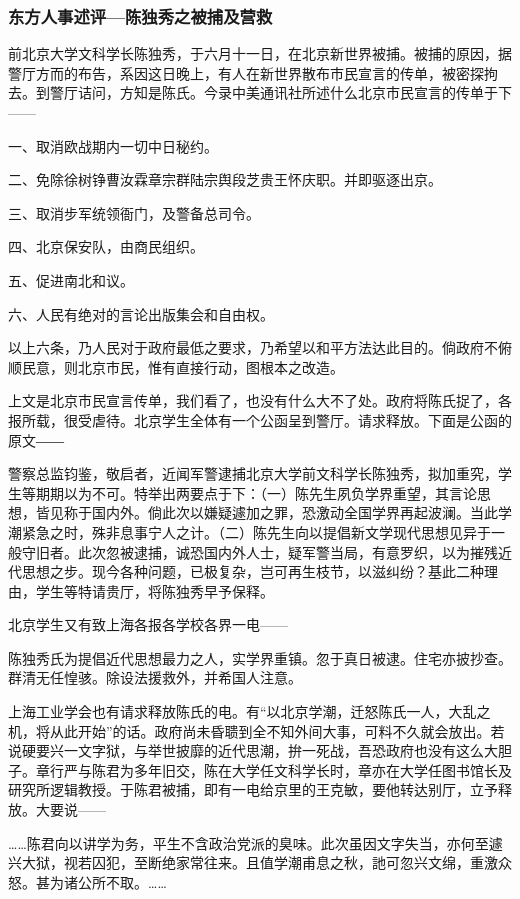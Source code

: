 \subsubsection{东方人事述评—陈独秀之被捕及营救}

前北京大学文科学长陈独秀，于六月十一日，在北京新世界被捕。被捕的原因，据警厅方而的布告，系因这日晚上，有人在新世界散布市民宣言的传单，被密探拘去。到警厅诘问，方知是陈氏。今录中美通讯社所述什么北京市民宣言的传单于下——

一、取消欧战期内一切中日秘约。

二、免除徐树铮曹汝霖章宗群陆宗舆段芝贵王怀庆职。并即驱逐出京。

三、取消步军统领衙门，及警备总司令。

四、北京保安队，由商民组织。

五、促进南北和议。

六、人民有绝对的言论出版集会和自由权。

以上六条，乃人民对于政府最低之要求，乃希望以和平方法达此目的。倘政府不俯顺民意，则北京市民，惟有直接行动，图根本之改造。

上文是北京市民宣言传单，我们看了，也没有什么大不了处。政府将陈氏捉了，各报所载，很受虐待。北京学生全体有一个公函呈到警厅。请求释放。下面是公函的原文――

警察总监钧鉴，敬启者，近闻军警逮捕北京大学前文科学长陈独秀，拟加重究，学生等期期以为不可。特举出两要点于下：（一）陈先生夙负学界重望，其言论思想，皆见称于国内外。倘此次以嫌疑遽加之罪，恐激动全国学界再起波澜。当此学潮紧急之时，殊非息事宁人之计。（二）陈先生向以提倡新文学现代思想见异于一般守旧者。此次忽被逮捕，诚恐国内外人士，疑军警当局，有意罗织，以为摧残近代思想之步。现今各种问题，已极复杂，岂可再生枝节，以滋纠纷？基此二种理由，学生等特请贵厅，将陈独秀早予保释。

北京学生又有致上海各报各学校各界一电——

陈独秀氏为提倡近代思想最力之人，实学界重镇。忽于真日被逮。住宅亦披抄查。群清无任惶骇。除设法援救外，并希国人注意。

上海工业学会也有请求释放陈氏的电。有“以北京学潮，迁怒陈氏一人，大乱之机，将从此开始”的话。政府尚未昏聩到全不知外间大事，可料不久就会放出。若说硬要兴一文字狱，与举世披靡的近代思潮，拚一死战，吾恐政府也没有这么大胆子。章行严与陈君为多年旧交，陈在大学任文科学长时，章亦在大学任图书馆长及研究所逻辑教授。于陈君被捕，即有一电给京里的王克敏，要他转达别厅，立予释放。大要说——

……陈君向以讲学为务，平生不含政治党派的臭味。此次虽因文字失当，亦何至遽兴大狱，视若囚犯，至断绝家常往来。且值学潮甫息之秋，訑可忽兴文绵，重激众怒。甚为诸公所不取。……

